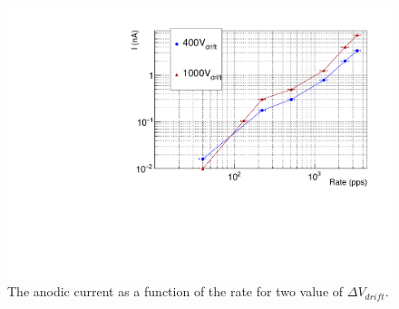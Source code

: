 \documentclass[a4paper, 11 pt]{report}
\newcommand{\Vdrift}{$ \Delta V_{drift}$}
\begin{document}
  \begin{figure}[htbp]
	\centering
	\includegraphics[width=\textwidth]{Immagini/RateScan_ROW.pdf}
	\caption{The anodic current as a function of the rate for two value of \Vdrift.}
	\label{fig:Rate_anodic_current_ROW}
  \end{figure}
  










\end{document}
